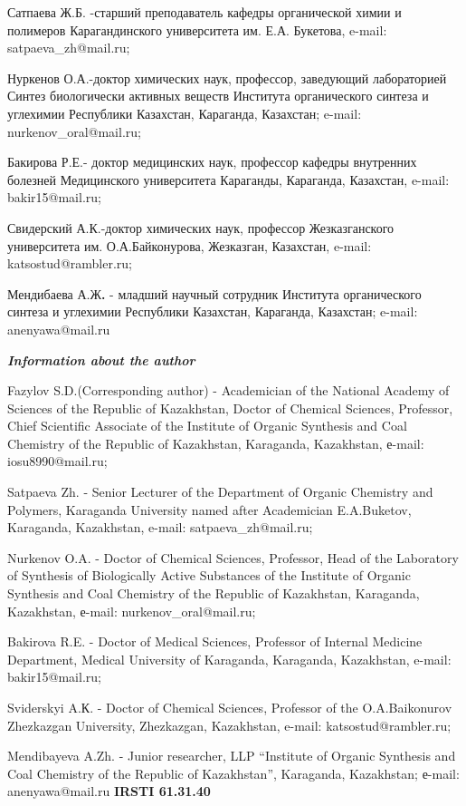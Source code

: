 Сатпаева Ж.Б. -старший преподаватель кафедры органической химии и
полимеров Карагандинского университета им. Е.А. Букетова, e-mail:
satpaeva\_zh@mail.ru;

Нуркенов О.А.-доктор химических наук, профессор, заведующий лабораторией
Синтез биологически активных веществ Института органического синтеза и
углехимии Республики Казахстан, Караганда, Казахстан; e-mail:
nurkenov\_oral@mail.ru;

Бакирова Р.Е.- доктор медицинских наук, профессор кафедры внутренних
болезней Медицинского университета Караганды, Караганда, Казахстан,
e-mail: bakir15@mail.ru;

Свидерский А.К.-доктор химических наук, профессор Жезказганского
университета им. О.А.Байконурова, Жезказган, Казахстан, e-mail:
katsostud@rambler.ru;

Мендибаева А.Ж{\bfseries .} - младший научный сотрудник Института
органического синтеза и углехимии Республики Казахстан, Караганда,
Казахстан; e-mail: anenyawa@mail.ru

\emph{{\bfseries Information about the author}}

Fazylov S.D.(Corresponding author) - Academician of the National Academy
of Sciences of the Republic of Kazakhstan, Doctor of Chemical Sciences,
Professor, Chief Scientific Associate of the Institute of Organic
Synthesis and Coal Chemistry of the Republic of Kazakhstan, Karaganda,
Kazakhstan, е-mail: iosu8990@mail.ru;

Satpaeva Zh. - Senior Lecturer of the Department of Organic Chemistry
and Polymers, Karaganda University named after Academician E.A.Buketov,
Karaganda, Kazakhstan, e-mail: satpaeva\_zh@mail.ru;

Nurkenov O.A. - Doctor of Chemical Sciences, Professor, Head of the
Laboratory of Synthesis of Biologically Active Substances of the
Institute of Organic Synthesis and Coal Chemistry of the Republic of
Kazakhstan, Karaganda, Kazakhstan, е-mail: nurkenov\_oral@mail.ru;

Bakirova R.E. - Doctor of Medical Sciences, Professor of Internal
Medicine Department, Medical University of Karaganda, Karaganda,
Kazakhstan, e-mail: bakir15@mail.ru;

Sviderskyi A.К. - Doctor of Chemical Sciences, Professor of the
O.A.Baikonurov Zhezkazgan University, Zhezkazgan, Kazakhstan, e-mail:
katsostud@rambler.ru;

Mendibayeva A.Zh. - Junior researcher, LLP ``Institute of Organic
Synthesis and Coal Chemistry of the Republic of Kazakhstan'', Karaganda,
Kazakhstan; е-mail: anenyawa@mail.ru\newpage
{\bfseries IRSTI 61.31.40}

